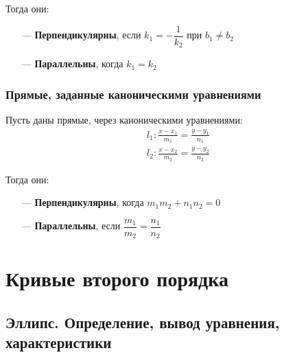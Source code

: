 \documentclass[a4paper,12pt,oneside]{extbook}
\theoremstyle{numbered}
\theoremstyle{unnumbered}
\theoremstyle{named}
\theoremstyle{unnumbered}
\theoremstyle{named}
\theoremstyle{named}
\theoremstyle{named}
\begin{document}
Тогда они:
\begin{itemize}
    \item[—]{\textbf{Перпендикулярны}, если \(k_1 = -\dfrac{1}{k_2}\) при \(b_1 \neq b_2\)}
    \item[—]{\textbf{Параллельны}, когда \(k_1 = k_2\)}
\end{itemize}

\subsection{Прямые, заданные каноническими уравнениями}
Пусть даны прямые, через каноническими уравнениями:
\begin{gather*}
    l_1: \frac{x - x_1}{m_1} = \frac{y - y_1}{n_1} \\
    l_2: \frac{x - x_2}{m_2} = \frac{y - y_2}{n_2}
\end{gather*}

Тогда они:
\begin{itemize}
    \item[—]{\textbf{Перпендикулярны}, когда \(m_1m_2 + n_1n_2 = 0\)}
    \item[—]{\textbf{Параллельны}, если \(\dfrac{m_1}{m_2} = \dfrac{n_1}{n_2}\)}
\end{itemize}

\chapter{Кривые второго порядка}%
\label{cha:Кривые второго порядка}

\section{Эллипс. Определение, вывод уравнения, характеристики}%
\label{sec:Эллипс. Определение, вывод уравнения, характеристики}
\end{document}
